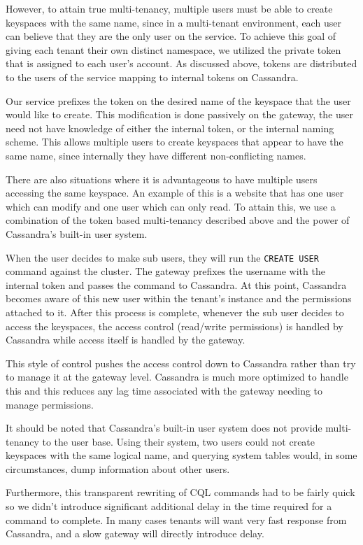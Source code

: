 \documentclass[11pt,notitlepage]{report}
\begin{document}
However, to attain true multi-tenancy, multiple users must be able to create keyspaces with the same name, since in a multi-tenant environment, each user can believe that they are the only user on the service. To achieve this goal of giving each tenant their own distinct namespace, we utilized the private token that is assigned to each user's account. As discussed above, tokens are distributed to the users of the service mapping to internal tokens on Cassandra. 

Our service prefixes the token on the desired name of the keyspace that the user would like to create. This modification is done passively on the gateway, the user need not have knowledge of either the internal token, or the internal naming scheme. This allows multiple users to create keyspaces that appear to have the same name, since internally they have different non-conflicting names. 

There are also situations where it is advantageous to have multiple users accessing the same keyspace. An example of this is a website that has one user which can modify and one user which can only read. To attain this, we use a combination of the token based multi-tenancy described above and the power of Cassandra's built-in user system. 

When the user decides to make sub users, they will run the \texttt{CREATE USER} command against the cluster. The gateway prefixes the username with the internal token and passes the command to Cassandra. At this point, Cassandra becomes aware of this new user within the tenant's instance and the permissions attached to it. After this process is complete, whenever the sub user decides to access the keyspaces, the access control (read/write permissions) is handled by Cassandra while access itself is handled by the gateway. 

This style of control pushes the access control down to Cassandra rather than try to manage it at the gateway level. Cassandra is much more optimized to handle this and this reduces any lag time associated with the gateway needing to manage permissions. 

It should be noted that Cassandra's built-in user system does not provide multi-tenancy to the user base. Using their system, two users could not create keyspaces with the same logical name, and querying system tables would, in some circumstances, dump information about other users. 

Furthermore, this transparent rewriting of CQL commands had to be fairly quick so we didn't introduce significant additional delay in the time required for a command to complete. In many cases tenants will want very fast response from Cassandra, and a slow gateway will directly introduce delay.
\end{document}
